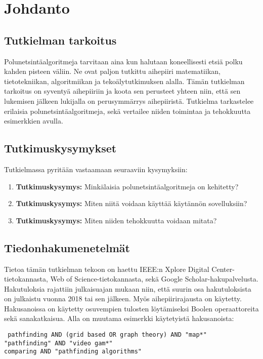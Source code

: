 \chapter{Johdanto} \label{Johdanto}

\section{Tutkielman tarkoitus}\label{tTarkoitus}
Polunetsintäalgoritmeja tarvitaan aina kun halutaan koneellisesti etsiä 
polku kahden pisteen väliin. Ne ovat paljon tutkittu aihepiiri matematiikan, 
tietotekniikan, algoritmiikan ja tekoälytutkimuksen alalla. Tämän tutkielman 
tarkoitus on syventyä aihepiiriin ja koota sen perusteet yhteen niin, että sen 
lukemisen jälkeen lukijalla on perusymmärrys aihepiiristä. Tutkielma 
tarkastelee erilaisia polunetsintäalgoritmeja, sekä vertailee niiden 
toimintaa ja tehokkuutta esimerkkien avulla.

\section{Tutkimuskysymykset}\label{tutkimuskysymykset}
Tutkielmassa pyritään vastaamaan seuraaviin kysymyksiin:
\begin{enumerate}[label=\textbf{\arabic*.}]
	\item \label{tKysymys1} \textbf{Tutkimuskysymys:} Minkälaisia polunetsintäalgoritmeja on kehitetty?
	\item \label{tKysymys2} \textbf{Tutkimuskysymys:} Miten niitä voidaan käyttää käytännön sovelluksiin?
	\item \label{tKysymys3} \textbf{Tutkimuskysymys:} Miten niiden tehokkuutta voidaan mitata?
\end{enumerate}

\section{Tiedonhakumenetelmät}\label{tiedonhakuM}
Tietoa tämän tutkielman tekoon on haettu IEEE:n Xplore Digital 
Center-tietokan\-nasta, Web of Science-tietokannasta, sekä Google 
Scholar-hakupalvelusta. Hakutuloksia rajattiin julkaisuajan mukaan niin, että 
suurin osa hakutuloksista on julkaistu vuonna 2018 tai sen jälkeen. Myös 
aihepiirirajausta on käytetty. Hakusanoissa on käytetty osuvempien tulosten 
löytämiseksi Boolen operaattoreita sekä sanakatkaisua. Alla on muutama 
esimerkki käytetyistä hakusanoista:
\begin{center}
\texttt{
	pathfinding AND (grid based OR graph theory) AND "map*"	\\
	"pathfinding" AND "video gam*"				\\
	comparing AND "pathfinding algorithms"			\\
}
\end{center}


